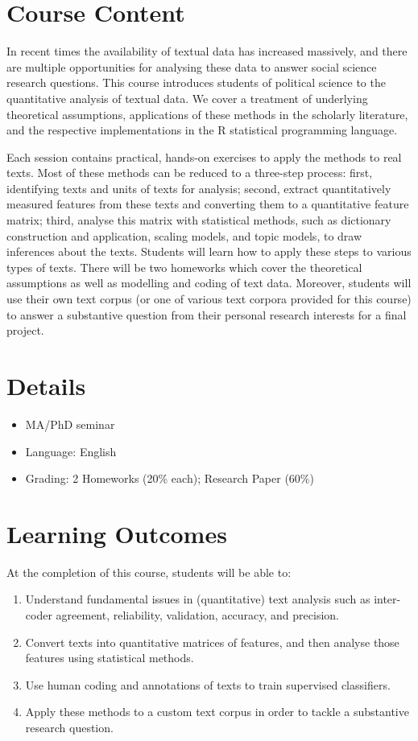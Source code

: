 \documentclass[abstract=on,parskip=full,headings=standardclasses,fontsize=11pt,paper=a4]{scrartcl}
\begin{document}
\section*{Course Content}

In recent times the availability of textual data has increased massively, and there are multiple opportunities for analysing these data to answer social science research questions. This course introduces students of political science to the quantitative analysis of textual data. We cover a treatment of underlying theoretical assumptions, applications of these methods in the scholarly literature, and the respective implementations in the \textsf{R} statistical programming language.

Each session  contains practical, hands-on exercises to apply the methods to real texts. Most of these methods can be reduced to a three-step process: first, identifying texts and units of texts for analysis; second, extract quantitatively measured features from these texts and converting them to a quantitative feature matrix; third, analyse this matrix with statistical methods, such as dictionary construction and application, scaling models, and topic models, to draw inferences about the texts. Students will learn how  to apply these steps to various types of texts. There will be two homeworks which cover the theoretical assumptions as well as modelling and coding of text data. Moreover, students will use their own text corpus (or one of various text corpora provided for this course) to answer a substantive question from their personal research interests for a final project.


\section*{Details}

\begin{itemize}
\item MA/PhD seminar
\item  Language: English
\item Grading: 2 Homeworks (20\% each); Research Paper (60\%)
\end{itemize}

\section*{Learning Outcomes}

At the completion of this course, students will be able to:
\begin{enumerate}
\item Understand fundamental issues in (quantitative) text analysis such as inter-coder agreement, reliability, validation, accuracy, and precision.
\item Convert texts into quantitative matrices of features, and then analyse those features using statistical methods.
\item Use human coding and annotations of texts to train supervised classifiers.
\item  Apply these methods to a custom text corpus in order to tackle a substantive research question.
\end{enumerate}
\end{document}
